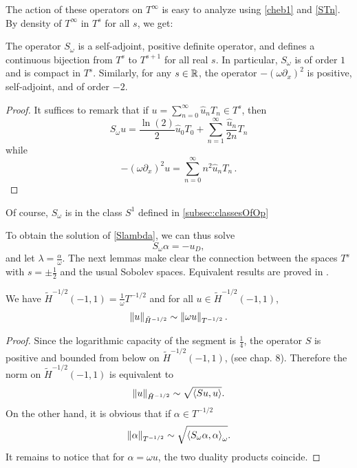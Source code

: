 \documentclass[a4paper]{article}
\begin{document}
The action of these operators on $T^{\infty}$ is easy to analyze using \eqref{cheb1} and \autoref{STn}. By density of $T^{\infty}$ in $T^s$ for all $s$, we get:
\begin{Prop}
	The operator $S_\omega$ is a self-adjoint, positive definite operator, and defines a continuous bijection from $T^{s}$ to $T^{s+1}$ for all real $s$. In particular, $S_\omega$ is of order $1$ and is compact in $T^s$. 
	Similarly, for any $s \in \mathbb{R}$, the operator $-(\omega \partial_x)^2$ is positive, self-adjoint, and of order $-2$. 
\end{Prop}
\begin{proof}
	It suffices to remark that if $u=\sum_{n=0}^\infty \hat{u}_n T_n \in T^s$, then
	\[S_\omega u = \frac{\ln(2)}{2} \hat{u}_0 T_0 +  \sum_{n=1}^\infty \frac{\hat{u}_n}{2n} T_n\]
	while
	\[-(\omega \partial_x)^2 u = \sum_{n=0}^\infty n^2\hat{u}_n T_n \,.\]
\end{proof}
\begin{Rem}
	Of course, $S_\omega$ is in the class $S^1$ defined in \autoref{subsec:classesOfOp}
\end{Rem}
\noindent To obtain the solution of \eqref{Slambda}, we can thus solve 
\begin{equation}
S_\omega \alpha = -u_D,
\label{Somegaalpha}
\end{equation}
and let $\lambda = \frac{\alpha}{\omega}$.  
The next lemmas make clear the connection between the spaces $T^s$ with $s = \pm \frac{1}{2}$ and the usual Sobolev spaces. Equivalent results are proved in \cite{jerez2010boundary}. 
\begin{Lem}
	\label{LemmaT-1/2}
	We have $\tilde{H}^{-1/2}(-1,1) = \frac{1}{\omega}T^{-1/2}$ and for all $u \in \tilde{H}^{-1/2}(-1,1)$,
	\[\left\|u\right\|_{\tilde{H}^{-1/2}} \sim \left\|\omega u\right\|_{T^{-1/2}}.\] 
\end{Lem}

\begin{proof}
	Since the logarithmic capacity of the segment is $\frac{1}{4}$, the operator $S$ is positive and bounded from below on $\tilde{H}^{-1/2}(-1,1)$, (see \cite{mclean2000strongly} chap. 8). Therefore the norm on $\tilde{H}^{-1/2}(-1,1)$ is equivalent to 
	\[\left\|u\right\|_{\tilde{H}^{-1/2}} \sim \sqrt{\left\langle Su,u\right\rangle}.\]
	On the other hand, it is obvious that if $\alpha\in T^{-1/2}$
	\[ \left\|\alpha\right\|_{T^{-1/2}} \sim \sqrt{\left\langle S_\omega \alpha,\alpha\right\rangle_\omega}.\]
	It remains to notice that for $\alpha=\omega u$, the two duality products coincide.
\end{proof}
\end{document}
